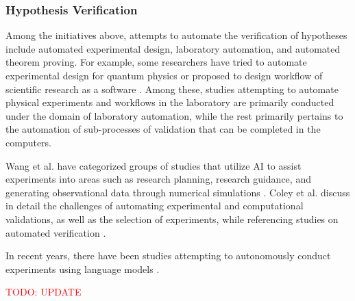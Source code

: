 

\subsubsection{Hypothesis Verification}
Among the initiatives above, attempts to automate the verification of hypotheses include automated experimental design, laboratory automation, and automated theorem proving. For example, some researchers have tried to automate experimental design for quantum physics \cite{ruiz2022digital} or proposed to design workflow of scientific research as a software \cite{goble2020fair}. Among these, studies attempting to automate physical experiments and workflows in the laboratory are primarily conducted under the domain of laboratory automation, while the rest primarily pertains to the automation of sub-processes of validation that can be completed in the computers.

Wang et al. have categorized groups of studies that utilize AI to assist experiments into areas such as research planning, research guidance, and generating observational data through numerical simulations \cite{wang2023scientific}. Coley et al. discuss in detail the challenges of automating experimental and computational validations, as well as the selection of experiments, while referencing studies on automated verification \cite{coley2020autonomousII}.




In recent years, there have been studies attempting to autonomously conduct experiments using language models \cite{boiko2023emergent}.

\textcolor{red}{TODO: UPDATE}

